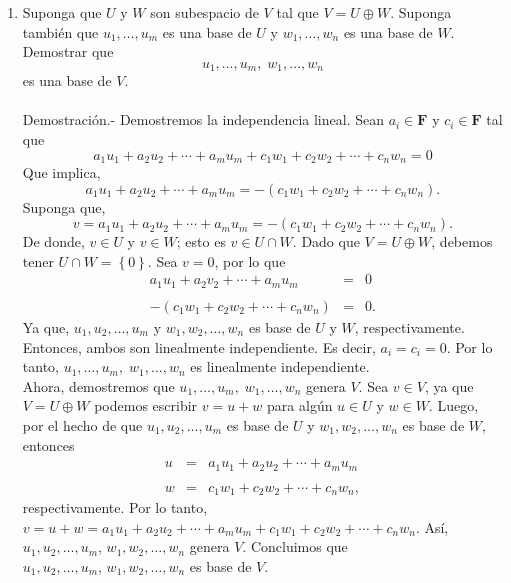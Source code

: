 \begin{enumerate}[\bfseries 1.]
    \item Suponga que $U$ y $W$ son subespacio de $V$ tal que $V=U\oplus W$. Suponga también que $u_1,\ldots,u_m$ es una base de $U$ y $w_1,\ldots,w_n$ es una base de $W$. Demostrar que 
    $$u_1,\ldots,u_m,\; w_1,\ldots,w_n$$
    es una base de $V$.\\\\
	Demostración.-\; Demostremos la independencia lineal. Sean $a_i\in \textbf{F}$ y $c_i\in \textbf{F}$ tal que
	$$a_1u_1+a_2u_2+\cdots+a_mu_m+c_1w_1+c_2w_2+\cdots+c_nw_n=0$$
	Que implica,
	$$a_1u_1+a_2u_2+\cdots+a_mu_m=-(c_1w_1+c_2w_2+\cdots+c_nw_n).$$
	Suponga que,
	$$v=a_1u_1+a_2u_2+\cdots+a_mu_m=-(c_1w_1+c_2w_2+\cdots+c_nw_n).$$
	De donde, $v\in U$ y $v\in W$; esto es $v\in U\cap W.$ Dado que $V=U\oplus W$, debemos tener $U\cap W=\left\{0\right\}$. Sea $v=0$, por lo que
	$$
	\begin{array}{rcl}
	    a_1u_1+a_2v_2+\cdots + a_mu_m &=& 0\\\\
	    -(c_1w_1+c_2w_2+\cdots + c_nw_n) &=& 0.
	\end{array}
	$$
	Ya que, $u_1,u_2,\ldots,u_m$ y $w_1,w_2,\ldots,w_n$ es base de $U$ y $W$, respectivamente. Entonces, ambos son linealmente independiente. Es decir, $a_i=c_i=0$. Por lo tanto, $u_1,\ldots,u_m,\; w_1,\ldots,w_n$ es linealmente independiente.\\
	Ahora, demostremos que $u_1,\ldots,u_m,\; w_1,\ldots,w_n$ genera $V$. Sea $v\in V$, ya que $V=U\oplus W$ podemos escribir $v=u+w$ para algún $u\in U$ y $w\in W$. Luego, por el hecho de que $u_1,u_2,\ldots,u_m$ es base de $U$ y $w_1,w_2,\ldots,w_n$ es base de $W$, entonces
	$$
	\begin{array}{rcl}
	    u &=& a_1u_1+a_2u_2+\cdots+a_mu_m\\\\
	    w &=& c_1w_1+c_2w_2+\cdots+c_nw_n,
	\end{array}
	$$
	respectivamente. Por lo tanto, $v=u+w=a_1u_1+a_2u_2+\cdots+a_mu_m+c_1w_1+c_2w_2+\cdots+c_nw_n$. Así, $u_1,u_2,\ldots,u_m,\, w_1,w_2,\ldots,w_n$ genera $V$. Concluimos que  $u_1,u_2,\ldots,u_m,\, w_1,w_2,\ldots,w_n$ es base de $V$.\\\\



	

\end{enumerate}




